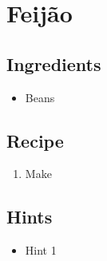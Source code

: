 \section{Feijão}
\subsection*{Ingredients}
\begin{itemize}
    \item Beans
\end{itemize}

\subsection*{Recipe}
\begin{enumerate}
    \item Make
\end{enumerate}

\subsection*{Hints}
\begin{itemize}
    \item Hint 1
\end{itemize}
\newpage